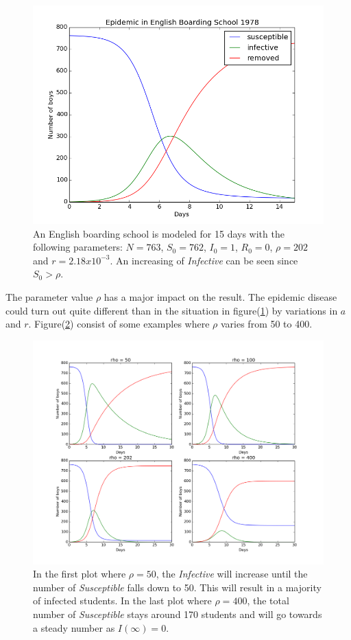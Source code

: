 \documentclass[%
twoside,                 %
final,                   %
10pt]{article}
\begin{document}
\begin{figure}[ht]
  \centerline{\includegraphics[width=0.9\linewidth]{plots/English_boarding_school.png}}
  \caption{
  \label{fig:english_boarding} An English boarding school is modeled for 15 days with the following parameters: $N=763$, $S_0=762$, $I_0=1$, $R_0=0$, $\rho=202$ and $r=2.18 x 10^{-3}$. An increasing of \emph{Infective} can be seen since $S_0 > \rho$.
  }
\end{figure}


The parameter value $\rho$ has a major impact on the result. The epidemic disease could turn out quite different than in the situation in figure(\ref{fig:english_boarding}) by variations in $a$ and $r$. Figure(\ref{fig:rho_changes}) consist of some examples where $\rho$ varies from 50 to 400.


\begin{figure}[ht]
  \centerline{\includegraphics[width=0.9\linewidth]{plots/English_boarding_school_changes.png}}
  \caption{
  \label{fig:rho_changes} In the first plot where $\rho=50$, the \emph{Infective} will increase until the number of \emph{Susceptible} falls down to 50. This will result in a majority of infected students. In the last plot where $\rho=400$, the total number of \emph{Susceptible} stays around 170 students and will go towards a steady number as $I(\infty)=0$.
  }
\end{figure}
\end{document}
